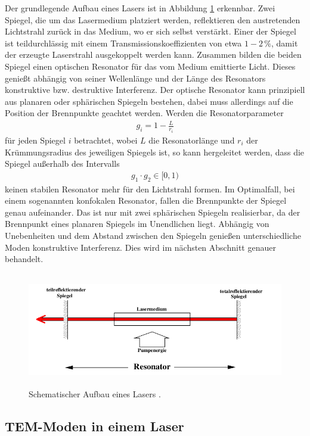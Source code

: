 Der grundlegende Aufbau eines Lasers ist in Abbildung \ref{fig:laseraufbau} erkennbar.
Zwei Spiegel, die um das Lasermedium platziert werden, reflektieren den austretenden
Lichtstrahl zurück in das Medium, wo er sich selbst verstärkt. Einer der Spiegel ist
teildurchlässig mit einem Transmissionskoeffizienten von etwa $1-2 \, \si{\percent}$,
damit der erzeugte Laserstrahl ausgekoppelt werden kann. Zusammen bilden die beiden
Spiegel einen optischen Resonator für das vom Medium emittierte Licht. Dieses genießt
abhängig von seiner Wellenlänge und der Länge des Resonators konstruktive bzw. destruktive
Interferenz. Der optische Resonator kann
prinzipiell aus planaren oder sphärischen Spiegeln bestehen, dabei muss allerdings auf
die Position der Brennpunkte geachtet werden. Werden die Resonatorparameter
\begin{align}
  g_i = 1 - \frac{L}{r_i}
\end{align}
für jeden Spiegel $i$ betrachtet, wobei $L$ die Resonatorlänge und $r_i$ der Krümmungsradius
des jeweiligen Spiegels ist, so kann hergeleitet werden, dass die Spiegel außerhalb des Intervalls
\begin{align}
  g_1 \cdot g_2 \in [0,1)
\end{align}
keinen stabilen Resonator mehr für den Lichtstrahl formen. Im Optimalfall, bei einem sogenannten
konfokalen Resonator, fallen die Brennpunkte der Spiegel genau aufeinander. Das ist nur mit
zwei sphärischen Spiegeln realisierbar, da der Brennpunkt eines planaren Spiegels im Unendlichen
liegt. Abhängig von Unebenheiten und dem Abstand zwischen den Spiegeln genießen unterschiedliche
Moden konstruktive Interferenz. Dies wird im nächsten Abschnitt genauer behandelt.

\begin{figure}
  \centering
  \includegraphics[height=5cm]{Pics von Buddy/laseraufbau.png}
  \caption{Schematischer Aufbau eines Lasers \cite{anleitung}.}
  \label{fig:laseraufbau}
\end{figure}

\subsection{TEM-Moden in einem Laser}

